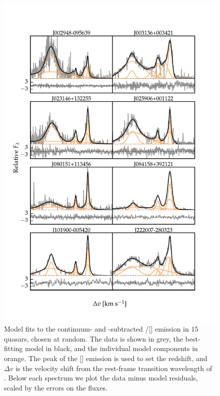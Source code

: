 \begin{figure}
    \centering
    \includegraphics[width=\textwidth]{figures/chapter04/example_spectrum_grid.pdf} 
    \caption[{Model fits to the continuum- and -subtracted \hbns/[] emission in eight quasars, chosen at random.}]{Model fits to the continuum- and -subtracted \hbns/[] emission in $15$ quasars, chosen at random. The data is shown in grey, the best-fitting model in black, and the individual model components in orange. The peak of the [] emission is used to set the redshift, and $\Delta{v}$ is the velocity shift from the rest-frame transition wavelength of \hb. Below each spectrum we plot the data minus model residuals, scaled by the errors on the fluxes.}     
    \label{fig:example_spectrum_grid}
\end{figure}

